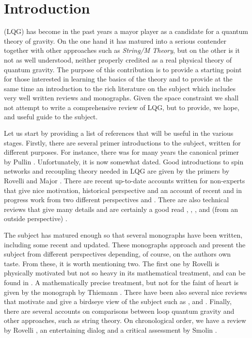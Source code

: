 \documentclass[aps,prd,tightenlines,showpacs,nofootinbib,preprint]{revtex4}
\begin{document}
\section{Introduction}


 (LQG) has become in the past
years a mayor player as a candidate for a quantum theory of
gravity. On the one hand it has matured into a serious contender
together with other approaches such as {\it String/M Theory}, but on the
other is it not as well understood, neither properly credited as a
real physical theory of quantum gravity. The purpose of this
contribution is to provide a starting point for those interested
in learning the basics of the theory and to provide at the same
time an introduction to the rich literature on the subject which
includes very well written reviews and monographs. Given the space
constraint we shall not attempt to write a comprehensive review of
LQG, but to provide, we hope, and useful guide to the subject.

Let us start by providing a list of references that will be useful
in the various stages. Firstly, there are several primer
introductions to the subject, written for different purposes. For
instance, there was for many years the canonical primer by Pullin
\cite{pullin}. Unfortunately, it is now somewhat dated. Good
introductions to spin networks and recoupling theory needed in LQG
are given by the primers by Rovelli \cite{Rovelli:1998gg} and
Major \cite{seth}. There are recent up-to-date accounts written
for non-experts that give nice motivation, historical perspective
and an account of recent and in progress work from two different
perspectives \cite{AA:NJP} and \cite{Smolin:2004sx}. There are
also technical reviews that give many details and are certainly a
good read \cite{AL:review}, \cite{Perez:2004hj},
\cite{Thiemann:2002nj}, and (from an outside perspective)
\cite{Nicolai:2005mc}.

The subject has matured enough so that several monographs have
been written, including some recent and updated. These monographs
approach and present the subject from  different perspectives
depending, of course, on the authors own taste. From these, it is
worth mentioning two. The first one by Rovelli is  physically
motivated but not so heavy in its  mathematical treatment, and can
be found in \cite{Rovelli:2004tv}. A mathematically precise
treatment, but not for the faint of heart is given by the
monograph by Thiemann \cite{Thiemann:2001yy}. There have been also
several nice reviews that motivate and give a birdseye view of the
subject such as \cite{Rovelli:1999hz}, \cite{Rovelli:1997yv} and
\cite{pullin2}. Finally, there are several accounts on comparisons
between loop quantum gravity and other approaches, such as string
theory. On chronological order, we have a review by Rovelli
\cite{Rovelli:1997qj}, an entertaining dialog
\cite{Rovelli:2003wd} and a critical assessment by Smolin
\cite{Smolin:2003rk}.
\end{document}
